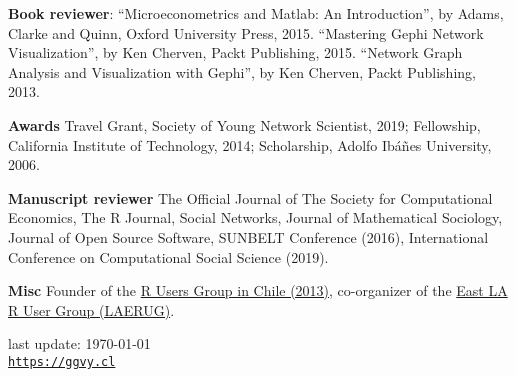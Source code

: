 \documentclass[letterpaper, 11pt]{article}
\def\footerlink{https://ggvy.cl}
\renewenvironment{itemize}{
  \begin{list}{}{
    \setlength{\leftmargin}{0.45cm}
  }
}{
  \end{list}
}
\begin{document}
\begin{itemize}
\item \textbf{Book reviewer}: ``Microeconometrics and Matlab: An Introduction'', by Adams, Clarke and Quinn, Oxford University Press, 2015. ``Mastering Gephi Network Visualization'', by Ken Cherven, Packt Publishing, 2015. ``Network Graph Analysis and Visualization with Gephi'', by Ken Cherven, Packt Publishing, 2013.
\item \textbf{Awards} Travel Grant, Society of Young Network Scientist, 2019; Fellowship, California Institute of Technology, 2014; Scholarship, Adolfo Ib\'a\~nes University, 2006.
\item \textbf{Manuscript reviewer} The Official Journal of The Society for Computational Economics, The R Journal, Social Networks, Journal of Mathematical Sociology, Journal of Open Source Software, SUNBELT Conference (2016), International Conference on Computational Social Science (2019).
\item \textbf{Misc} Founder of the \href{https://www.meetup.com/useRchile/}{R Users Group in Chile (2013)}, co-organizer of the \href{https://socalr.org}{East LA R User Group (LAERUG)}.
\end{itemize}

\bigskip

\begin{center}
 \begin{footnotesize}
   last update: \today \\
   \href{\footerlink}{\texttt{\footerlink}}
 \end{footnotesize}
\end{center}
\end{document}
